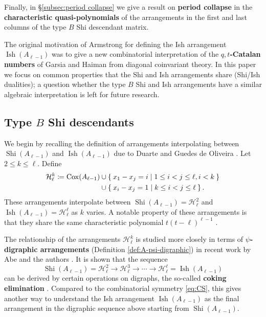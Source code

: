 \documentclass[11pt]{article}
\theoremstyle{definition}
\numberwithin{equation}{section}
\DeclareMathOperator{\Cox}{Cox}
\DeclareMathOperator{\Shi}{Shi}
\DeclareMathOperator{\Ish}{Ish}
\newcommand{\Hh}{\mathcal{H}}
\newcommand{\tbf}{\textbf}
\begin{document}
Finally, in \S\ref{subsec:period collapse} we give a result on \tbf{period collapse} in the \tbf{characteristic quasi-polynomials} of the arrangements in the first and last columns of the type $B$ Shi descendant matrix. 

The original motivation of Armstrong \cite{Arms13} for defining the Ish arrangement $ \Ish(A_{\ell-1}) $ was to  give a new combinatorial interpretation of the \tbf{$q,t$-Catalan numbers} of Garsia and Haiman from diagonal coinvariant theory.
In this paper we focus on common properties that the Shi and Ish arrangements share (Shi/Ish dualities); a question whether the type $B$ Shi and Ish arrangements have a similar algebraic interpretation is left for future research. 

\subsection{Type \texorpdfstring{$B$}{B} Shi  descendants}
\label{subsec:BShi-des}


We begin by recalling the definition of arrangements interpolating between $\Shi(A_{\ell-1})$ and $\Ish(A_{\ell-1})$ due to Duarte and Guedes de Oliveira \cite{DG18}.
Let $2 \leq k \leq \ell$. Define 
\begin{align*}
\Hh_{\ell}^{k}  \coloneqq \Cox(A_{\ell-1}) 
&\cup \Set{ x_{1}-x_{j}=i  | 1 \leq i < j \leq \ell, i < k} \\
&\cup \Set{ x_{i}-x_{j}=1  | k \leq i < j \leq \ell}. 
\end{align*}
These arrangements  interpolate between $\Shi(A_{\ell-1}) = \Hh_{\ell}^{2} $ and  $ \Ish(A_{\ell-1}) = \Hh_{\ell}^{\ell} $ as $k$ varies. 
A notable property of these arrangements is that they share the same characteristic polynomial $t(t-\ell)^{\ell-1}$ \cite[Theorem 2.2]{DG18}. 
 
 The relationship of the arrangements $\Hh_{\ell}^{k}$ is studied more closely in terms of \tbf{$\psi$-digraphic arrangements} (Definition \ref{def:A-psi-digraphic}) in recent work by Abe and the authors \cite{ATT24}. 
 It is shown that the sequence 
$$  \Shi(A_{\ell-1})=\Hh_{\ell}^{2} \longrightarrow\Hh_{\ell}^{3}\longrightarrow\cdots\longrightarrow \Hh_{\ell}^{\ell} =  \Ish(A_{\ell-1}) $$
can be derived by certain operations on digraphs, the so-called \tbf{coking elimination}   \cite[Definition 2.15 and Theorem 3.13]{ATT24}.
Compared to the combinatorial symmetry \eqref{eq:CS}, this gives another way to understand the Ish arrangement $\Ish(A_{\ell-1}) $ as the final arrangement in the digraphic sequence above starting from $ \Shi(A_{\ell-1})$.
\end{document}
